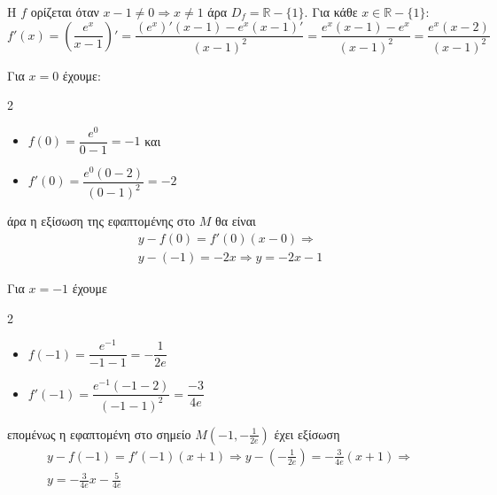 \lysh
Η $f$ ορίζεται όταν $x-1\neq 0\Rightarrow x\neq 1$ άρα $D_f=\mathbb{R}-\{1\}$. Για κάθε $x\in\mathbb{R}-\{1\}$:
\[f'(x)=\left(\frac{e^x}{x-1}\right)'=\frac{\left(e^x\right)'(x-1)-e^x(x-1)'}{(x-1)^2}=\frac{e^x(x-1)-e^x}{(x-1)^2}=\frac{e^x(x-2)}{(x-1)^2}\]
\begin{alist}
\item Για $x=0$ έχουμε:
\begin{multicols}{2}
\begin{itemize}
\item $f(0)=\dfrac{e^0}{0-1}=-1$ και 
\item $f'(0)=\dfrac{e^0(0-2)}{(0-1)^2}=-2$
\end{itemize}
\end{multicols}
άρα η εξίσωση της εφαπτομένης στο $M$ θα είναι
\begin{gather*}
y-f(0)=f'(0)(x-0)\Rightarrow\\
y-(-1)=-2x\Rightarrow y=-2x-1
\end{gather*}
\item Για $x=-1$ έχουμε
\begin{multicols}{2}
\begin{itemize}
\item $f(-1)=\dfrac{e^{-1}}{-1-1}=-\dfrac{1}{2e}$
\item $f'(-1)=\dfrac{e^{-1}(-1-2)}{(-1-1)^2}=\dfrac{-3}{4e}$
\end{itemize}
\end{multicols}
επομένως η εφαπτομένη στο σημείο $M\left(-1,-\frac{1}{2e}\right)$ έχει εξίσωση
\begin{gather*}
y-f(-1)=f'(-1)(x+1)\Rightarrow
y-\left(-\frac{1}{2e}\right)=-\frac{3}{4e}(x+1)\Rightarrow\\
y=-\frac{3}{4e}x-\frac{5}{4e}
\end{gather*}
\end{alist}
